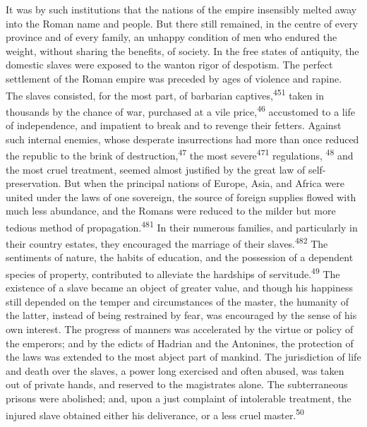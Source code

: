 It was by such institutions that the nations of the empire
insensibly melted away into the Roman name and people. But there
still remained, in the centre of every province and of every
family, an unhappy condition of men who endured the weight,
without sharing the benefits, of society. In the free states of
antiquity, the domestic slaves were exposed to the wanton rigor
of despotism. The perfect settlement of the Roman empire was
preceded by ages of violence and rapine. The slaves consisted,
for the most part, of barbarian captives,\textsuperscript{451} taken in thousands
by the chance of war, purchased at a vile price,\textsuperscript{46} accustomed to
a life of independence, and impatient to break and to revenge
their fetters. Against such internal enemies, whose desperate
insurrections had more than once reduced the republic to the
brink of destruction,\textsuperscript{47} the most
severe\textsuperscript{471} regulations, \textsuperscript{48} and
the most cruel treatment, seemed almost justified by the great
law of self-preservation. But when the principal nations of
Europe, Asia, and Africa were united under the laws of one
sovereign, the source of foreign supplies flowed with much less
abundance, and the Romans were reduced to the milder but more
tedious method of propagation.\textsuperscript{481} In their numerous families,
and particularly in their country estates, they encouraged the
marriage of their slaves.\textsuperscript{482} The sentiments of nature, the
habits of education, and the possession of a dependent species of
property, contributed to alleviate the hardships of servitude.\textsuperscript{49}
The existence of a slave became an object of greater value, and
though his happiness still depended on the temper and
circumstances of the master, the humanity of the latter, instead
of being restrained by fear, was encouraged by the sense of his
own interest. The progress of manners was accelerated by the
virtue or policy of the emperors; and by the edicts of Hadrian
and the Antonines, the protection of the laws was extended to the
most abject part of mankind. The jurisdiction of life and death
over the slaves, a power long exercised and often abused, was
taken out of private hands, and reserved to the magistrates
alone. The subterraneous prisons were abolished; and, upon a just
complaint of intolerable treatment, the injured slave obtained
either his deliverance, or a less cruel master.\textsuperscript{50}

